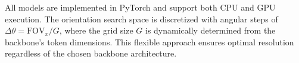All models are implemented in PyTorch and support both CPU and GPU execution. The orientation search space is discretized with angular steps of $\Delta\theta = \text{FOV}_x / G$, where the grid size $G$ is dynamically determined from the backbone's token dimensions. This flexible approach ensures optimal resolution regardless of the chosen backbone architecture.